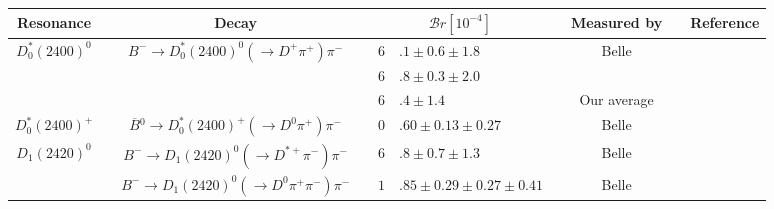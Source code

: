 \begin{adjustbox}{width=\textwidth,center}
{\setlength\tabcolsep{0pt}
	\begin{tabular}{cp{5pt}cp{5pt}r@{}lp{5pt}cp{5pt}c}
		\toprule
		\rowcolor{Gray} Resonance&&Decay &&\multicolumn{2}{c}{$\mathcal{B}r[10^{-4}]$} & & \multicolumn{1}{c}{Measured by} &&  \multicolumn{1}{c}{Reference}
		\\ \midrule
		\multirow{3}{*}{$D_{0}^{*}(2400)^{0}$}       &   & \multirow{3}{*}{$B^{-}\to D_{0}^{*}(2400)^{0}(\to D^{+}\pi^{+})\pi^{-}$}                 &                       & $6$                                  & $.1\pm0.6\pm1.8$                                &                       & Belle                         &                       & \cite{Abe:2003zm}    \\ 
		                                             &   &                                                                                          &                       & $6$                                  & $.8\pm0.3\pm2.0$                                &                       & \babar{}                      &                       & \cite{Aubert:2009wg} \\  \cmidrule{4-9}
		                                             &   &                                                                                          & \cellcolor{Gray}      & \cellcolor{Gray}$6$                  & \cellcolor{Gray}$.4\pm 1.4$                     & \cellcolor{Gray}      & \cellcolor{Gray}  Our average & \cellcolor{Gray}      &                      \\ \midrule
		\multirow{1}{*}{$D_{0}^{*}(2400)^{+}$}     &   & \multirow{1}{*}{$\overline{B}{}^{0}\to D_{0}^{*}(2400)^{+}(\to D^{0}\pi^{+})\pi^{-}$}    & \cellcolor{LightGray} & \cellcolor{LightGray} $0$            & \cellcolor{LightGray}$.60\pm0.13\pm0.27$        & \cellcolor{LightGray} & \cellcolor{LightGray} Belle   & \cellcolor{LightGray} & \cite{Kuzmin:2006mw} \\	\midrule		
		\multirow{2}{*}{$D_{1}^{}(2420)^{0}$}        &   & \multirow{1}{*}{$B^{-}\to D_{1}^{}(2420)^{0}(\to D^{*+}\pi^{-})\pi^{-}$}                 & \cellcolor{LightGray} & \cellcolor{LightGray} $6$            & \cellcolor{LightGray}$.8\pm0.7\pm1.3$           & \cellcolor{LightGray} & \cellcolor{LightGray} Belle   & \cellcolor{LightGray} & \cite{Abe:2003zm}    \\	\cmidrule{4-9}
		                                             &   & \multirow{1}{*}{$B^{-}\to D_{1}^{}(2420)^{0}(\to D^{0}\pi^{+}\pi^{-})\pi^{-}$}           & \cellcolor{LightGray} & \cellcolor{LightGray} $1$            & \cellcolor{LightGray}$.85\pm0.29\pm0.27\pm0.41$ & \cellcolor{LightGray} & \cellcolor{LightGray} Belle   & \cellcolor{LightGray} & \cite{Abe:2004sm}    \\	\midrule					

\end{tabular}}
\end{adjustbox}
